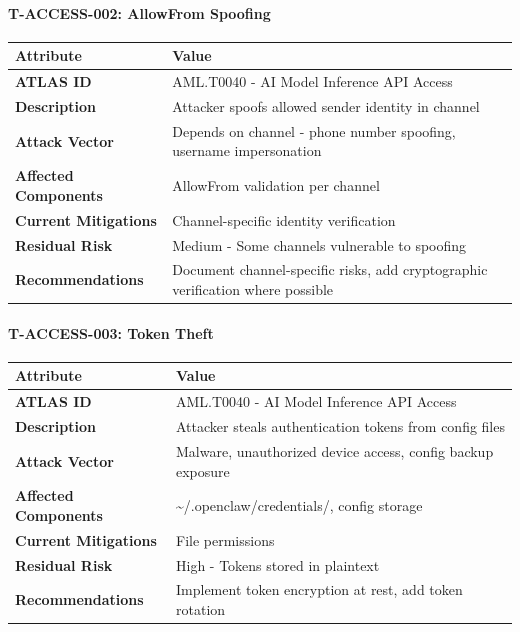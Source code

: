 \paragraph{T-ACCESS-002: AllowFrom Spoofing}



\begin{table}[h]
\centering
\small
\begin{tabular}{|l|l|}
\hline
Attribute & Value \\
\hline
\textbf{ATLAS ID} & AML.T0040 - AI Model Inference API Access \\
\hline
\textbf{Description} & Attacker spoofs allowed sender identity in channel \\
\hline
\textbf{Attack Vector} & Depends on channel - phone number spoofing, username impersonation \\
\hline
\textbf{Affected Components} & AllowFrom validation per channel \\
\hline
\textbf{Current Mitigations} & Channel-specific identity verification \\
\hline
\textbf{Residual Risk} & Medium - Some channels vulnerable to spoofing \\
\hline
\textbf{Recommendations} & Document channel-specific risks, add cryptographic verification where possible \\
\hline
\end{tabular}
\end{table}



\paragraph{T-ACCESS-003: Token Theft}



\begin{table}[h]
\centering
\small
\begin{tabular}{|l|l|}
\hline
Attribute & Value \\
\hline
\textbf{ATLAS ID} & AML.T0040 - AI Model Inference API Access \\
\hline
\textbf{Description} & Attacker steals authentication tokens from config files \\
\hline
\textbf{Attack Vector} & Malware, unauthorized device access, config backup exposure \\
\hline
\textbf{Affected Components} & \textasciitilde{}/.openclaw/credentials/, config storage \\
\hline
\textbf{Current Mitigations} & File permissions \\
\hline
\textbf{Residual Risk} & High - Tokens stored in plaintext \\
\hline
\textbf{Recommendations} & Implement token encryption at rest, add token rotation \\
\hline
\end{tabular}
\end{table}



